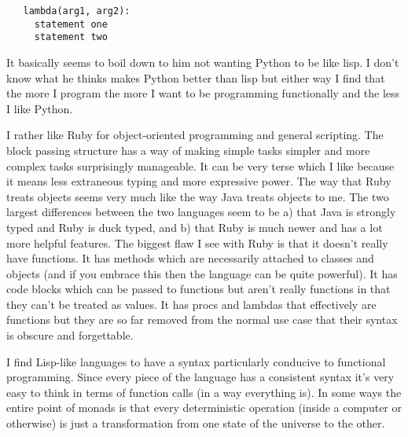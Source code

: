 \documentclass[11pt]{article}
\begin{document}
\begin{verbatim}
   lambda(arg1, arg2):
     statement one
     statement two
\end{verbatim}


  It basically seems to boil down to him not wanting Python to be like
  lisp.  I don't know what he thinks makes Python better than lisp but
  either way I find that the more I program the more I want to be
  programming functionally and the less I like Python.
  
  I rather like Ruby for object-oriented programming and general
  scripting.  The block passing structure has a way of making simple
  tasks simpler and more complex tasks surprisingly manageable.  It
  can be very terse which I like because it means less extraneous
  typing and more expressive power.  The way that Ruby treats objects
  seems very much like the way Java treats objects to me.  The two
  largest differences between the two languages seem to be a) that Java
  is strongly typed and Ruby is duck typed, and b) that Ruby is much
  newer and has a lot more helpful features.  The biggest flaw I see
  with Ruby is that it doesn't really have functions.  It has methods
  which are necessarily attached to classes and objects (and if you
  embrace this then the language can be quite powerful).  It has
  code blocks which can be passed to functions but aren't really
  functions in that they can't be treated as values.  It has procs and
  lambdas that effectively are functions but they are so far removed
  from the normal use case that their syntax is obscure and
  forgettable.
  
  I find Lisp-like languages to have a syntax particularly conducive
  to functional programming.  Since every piece of the language has
  a consistent syntax it's very easy to think in terms of function
  calls (in a way everything is).  In some ways the entire point of
  monads is that every deterministic operation (inside a computer or
  otherwise) is just a transformation from one state of the universe
  to the other.
\end{document}
